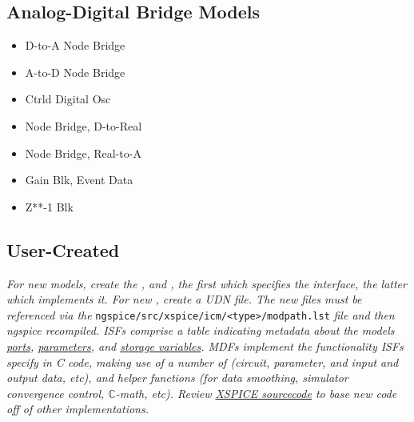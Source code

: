 \subsection*{Analog-Digital Bridge Models}
{\footnotesize
\begin{multicols}{2}\begin{itemize}[label={},leftmargin=0pt]
    \item D-to-A Node Bridge
    \item A-to-D Node Bridge
    \item Ctrld Digital Osc
    \item Node Bridge, D-to-Real
    \item Node Bridge, Real-to-A
    \item Gain Blk, Event Data
    \item Z**-1 Blk
\end{itemize}\end{multicols}
}



\subsection*{User-Created}

\textit{For new models, create the , and , the first which specifies the interface, the latter which implements it. For new , create a UDN file. The new files must be referenced via the }\texttt{ngspice/src/xspice/icm/<type>/modpath.lst}\textit{ file and then ngspice recompiled. ISFs comprise a table indicating metadata about the model\textquotesingle s \ul{ports}, \ul{parameters}, and \ul{storage variables}. MDFs implement the functionality ISFs specify in C code, making use of a number of  (circuit, parameter, and input and output data, etc), and helper functions (for data smoothing, simulator convergence control, $\mathbb{C}$-math, etc). Review \href{https://sourceforge.net/p/ngspice/ngspice/ci/master/tree/src/xspice/}{XSPICE sourcecode} to base new code off of other implementations.}\\


